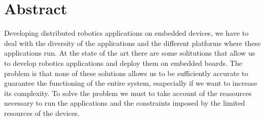 \chapter{Abstract}
Developing distributed robotics applications on embedded devices, we have to deal with the diversity of the applications and the different platforms where these applications run.
At the state of the art there are some solitutions that allow us to develop robotics applications and deploy them on embedded boards. 
The problem is that none of these solutions allows us to be sufficiently accurate to guarantee the functioning of the entire system, esapecially if we want to increase its complexity.
To solve the problem we must to take account of the reasources necessary to run the applications and the constraints imposed by the limited resources of the devices.








\clearpage
\thispagestyle{empty}